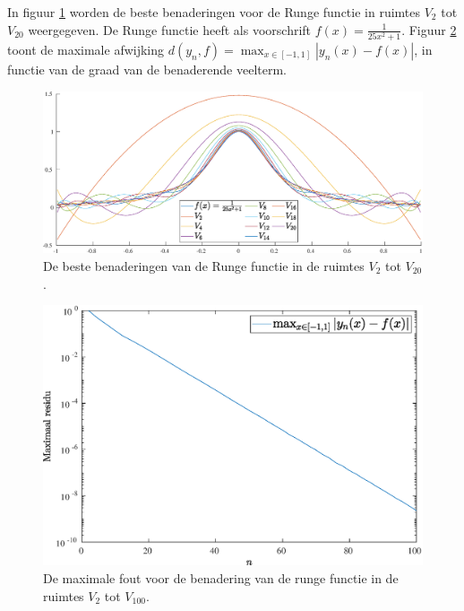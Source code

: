 \documentclass[a4paper, 12pt, titlepage, fleqn]{article}
\begin{document}
In figuur \ref{fig:rungeFunctie} worden de beste benaderingen voor de Runge functie in ruimtes $V_2$ tot $V_{20}$ weergegeven. De Runge functie heeft als voorschrift $f(x) = \frac{1}{25x^2+1}$. Figuur \ref{fig:rungeFout} toont de maximale afwijking $d(y_n,f) = \max_{x \in [-1,1]}|y_n(x)-f(x)|$, in functie van de graad van de benaderende veelterm. 
\begin{figure}
\centering
\includegraphics[scale=0.4]{../Afbeeldingen/rungeBenadering.eps}
\caption{De beste benaderingen van de Runge functie in de ruimtes $V_2$ tot $V_{20}$.
\label{fig:rungeFunctie}}
\end{figure}

\begin{figure}
\centering
\includegraphics[scale=0.4]{../Afbeeldingen/rungeFout.eps}
\caption{De maximale fout voor de benadering van de runge functie in de ruimtes $V_2$ tot $V_{100}$.
\label{fig:rungeFout}}
\end{figure}
\end{document}
